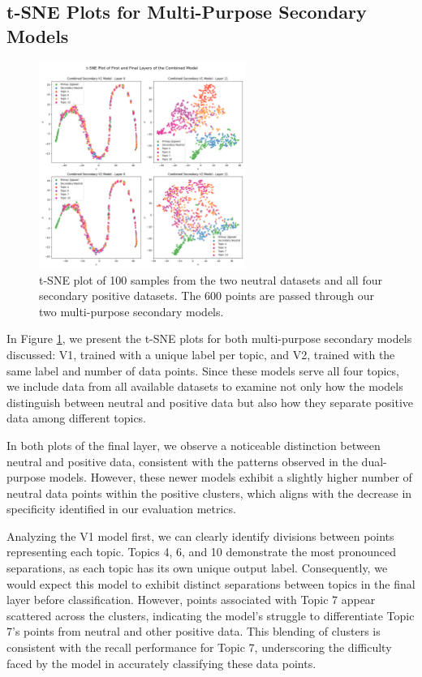 \subsection{t-SNE Plots for Multi-Purpose Secondary Models}

\begin{figure}[ht]
    \centering
    \includegraphics[width=0.6\textwidth]{graphs/tsne/combined.png}
    \caption{t-SNE plot of 100 samples from the two neutral datasets and all four secondary positive datasets. The 600 points are passed through our two multi-purpose secondary models.}
    \label{fig:t_sne_plot_comb}
\end{figure}

In Figure \ref{fig:t_sne_plot_comb}, we present the t-SNE plots for both multi-purpose secondary models discussed: V1, trained with a unique label per topic, and V2, trained with the same label and number of data points. Since these models serve all four topics, we include data from all available datasets to examine not only how the models distinguish between neutral and positive data but also how they separate positive data among different topics.

In both plots of the final layer, we observe a noticeable distinction between neutral and positive data, consistent with the patterns observed in the dual-purpose models. However, these newer models exhibit a slightly higher number of neutral data points within the positive clusters, which aligns with the decrease in specificity identified in our evaluation metrics.

Analyzing the V1 model first, we can clearly identify divisions between points representing each topic. Topics 4, 6, and 10 demonstrate the most pronounced separations, as each topic has its own unique output label. Consequently, we would expect this model to exhibit distinct separations between topics in the final layer before classification. However, points associated with Topic 7 appear scattered across the clusters, indicating the model's struggle to differentiate Topic 7's points from neutral and other positive data. This blending of clusters is consistent with the recall performance for Topic 7, underscoring the difficulty faced by the model in accurately classifying these data points.

